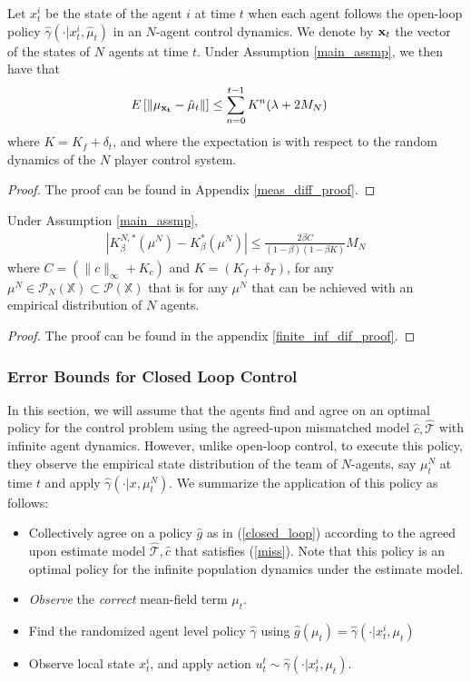 \documentclass[twoside,11pt]{article}
\def\P{{\mathcal P}}
\begin{document}
\begin{lemma}\label{meas_diff}
Let $x_t^i$ be the state of the agent $i$ at time $t$ when each agent follows the open-loop policy $\hat{\gamma}(\cdot|x^i_t,\hat{\mu}_t)$ in an $N$-agent control dynamics. We denote by ${\bf x}_t$ the vector of the states of $N$ agents at time $t$. Under Assumption \ref{main_assmp}, we then have that
\begin{align*}
&E\left[ \left\|\mu_{\bf x_{t}} - \hat{\mu}_{t}\right\|\right]  \leq \sum_{n=0}^{t-1} K^n( \lambda + 2 M_N )
\end{align*}
where $K=K_f + \delta_t$, and where the expectation is with respect to the random dynamics of the $N$ player control system.
\end{lemma}

\begin{proof}
The proof can be found in Appendix \ref{meas_diff_proof}.
\end{proof}


\begin{lemma}\label{finite_inf_dif}
Under Assumption \ref{main_assmp}, 
\begin{align*}
\left| K_\beta^{N,*}(\mu^N) - K_\beta^*(\mu^N)\right| \leq \frac{2\beta C}{(1-\beta)(1-\beta K)}M_N
\end{align*}
where $C=(\|c\|_\infty + K_c)$ and $K=(K_f + \delta_T)$, for any $\mu^N \in \P_N(\mathds{X}) \subset \P(\mathds{X})$ that is for any $\mu^N$ that can be achieved with an empirical distribution of $N$ agents.
\end{lemma}
\begin{proof}
The proof can be found in the appendix \ref{finite_inf_dif_proof}.
\end{proof}


\subsubsection{Error Bounds for Closed Loop Control} In this section, we will assume that the agents find and agree on an  optimal policy for the control problem using the agreed-upon mismatched model $\hat{c}, \hat{\mathcal{T}}$ with infinite agent dynamics. However, unlike open-loop control, to execute this policy, they observe the empirical state distribution of the team of $N$-agents, say $\mu_t^N$ at time $t$ and apply $\hat{\gamma}(\cdot|x,\mu_t^N)$. We summarize the application of this policy as follows: 
\begin{itemize}
\item Collectively agree on a policy $\hat{g}$ as in (\ref{closed_loop}) according to the agreed upon estimate model $\hat{\mathcal{T}},\hat{c}$ that satisfies (\ref{miss}). Note that this policy is an optimal policy for the infinite population dynamics under the estimate model.
\item {\it Observe} the {\it correct} mean-field term ${\mu}_t$.
\item Find the randomized agent level policy $\hat{\gamma}$ using $\hat{g}({\mu}_t) = \hat{\gamma}(\cdot|x_t^i,{\mu}_t)$
\item Observe local state $x_t^i$, and apply action $u_t^t\sim\hat{\gamma}(\cdot|x_t^i,{\mu}_t)$.
\end{itemize}
\end{document}
